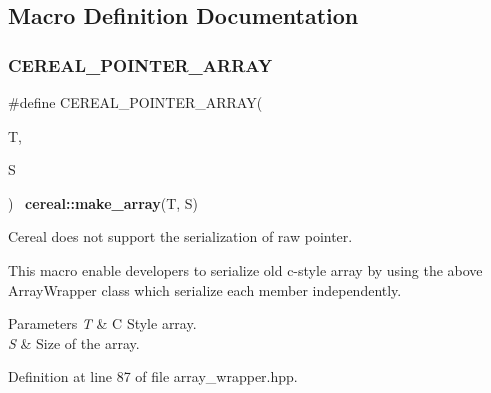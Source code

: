 \subsection{Macro Definition Documentation}
\mbox{\label{array__wrapper_8hpp_a5ef01a075a94d19512cf3b64393ac7d4}} 
\subsubsection{C\+E\+R\+E\+A\+L\+\_\+\+P\+O\+I\+N\+T\+E\+R\+\_\+\+A\+R\+R\+AY}
{\footnotesize\ttfamily \#define C\+E\+R\+E\+A\+L\+\_\+\+P\+O\+I\+N\+T\+E\+R\+\_\+\+A\+R\+R\+AY(\begin{DoxyParamCaption}\item[{}]{T,  }\item[{}]{S }\end{DoxyParamCaption})~\textbf{ cereal\+::make\+\_\+array}(T, S)}



Cereal does not support the serialization of raw pointer. 

This macro enable developers to serialize old c-\/style array by using the above Array\+Wrapper class which serialize each member independently.


\begin{DoxyParams}{Parameters}
{\em T} & C Style array. \\
\hline
{\em S} & Size of the array. \\
\hline
\end{DoxyParams}


Definition at line 87 of file array\+\_\+wrapper.\+hpp.


